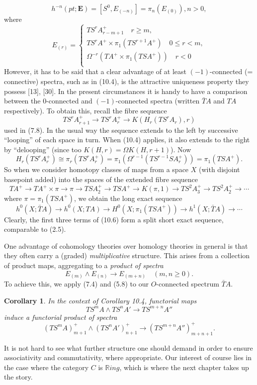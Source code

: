 \documentclass[openany,leqno]{book}  %
\newtheorem{corollary}[theorem]{Corollary}
\begin{document}
\[h^{-n}(pt;\mathbf{E}) = [S^0, E_{(-n)}] = \pi_n(E_{(0)}), n>0,\]
where
\begin{equation}
E_{(r)}=
  \begin{cases}
TS^rA^+_{r-m+1} \quad r\geqslant m, \\
TS^rA^+ \times \pi_1(TS^{r+1}A^+) \quad 0\leqslant r<m,\\
\Omega^{-r}(TA^+ \times\pi_1(TSA^+))  \quad r<0 \\
\end{cases}
\end{equation}
However, it has to be said that a clear advantage of at least $(-1)$-connected (= connective) spectra, such as in (10.4), is the attractive uniqueness property they possess [13], [30]. In the present circumstances it is handy to have a comparison between the $0$-connected and $(-1)$-connected spectra (written $\bar{T}A$ and $TA$ respectively). To obtain this, recall the fibre sequence
\[TS^rA^+_{r+1} \longrightarrow TS^rA_r^+\longrightarrow K(H_r(TS^rA_r),r)\]
used in (7.8). In the usual way the sequence extends to the left by successive ``looping'' of each space in turn. When (10.4) applies, it also extends to the right by ``delooping'' (since too $K(H,r) = \Omega K(H,r+1)$). Now
\[H_r(TS^rA_r^+) \cong \pi_r(TS^rA_r^+) = \pi_1 (\Omega^{r-1}(TS^{r-1}SA_r^+)) = \pi_1(TSA^+).\]
So when we consider homotopy classes of maps from a space $X$ (with disjoint basepoint added) into the spaces of the extended fibre sequence
\[TA^+ \longrightarrow TA^+ \times \pi \longrightarrow \pi \longrightarrow TSA_2^+ \longrightarrow TSA^+ \longrightarrow K(\pi, 1) \longrightarrow TS^2A_3^+ \longrightarrow TS^2A^+_2 \longrightarrow \cdots \]
where $\pi = \pi_1(TSA^+)$, we obtain the long exact sequence
\begin{equation}
  h^0(X; \bar{T}A) \longrightarrow h^0(X; TA)\longrightarrow  H^0(X; \pi_1(TSA^+))\longrightarrow  h^1(X; \bar{T}A)\longrightarrow  \cdots
\end{equation}
Clearly, the first three terms of (10.6) form a split short exact sequence, comparable to (2.5).

One advantage of cohomology theories over homology theories in general is that they often carry a (graded) {\em multiplicative} structure. This arises from a collection of product maps, aggregating to a {\em product of spectra}
\[E_{(m)}\wedge E_{(n)}\longrightarrow E_{(m+n)} \quad (m,n\geqslant 0).\]
To achieve this, we apply (7.4) and (5.8) to our $O$-connected spectrum $\bar{T}A$.
\begin{corollary}
  In the context of Corollary 10.4, functorial maps 
  \[TS^mA \wedge TS^nA'\longrightarrow TS^{m+n}A''\]
   induce a functorial product of spectra
   \[(TS^mA)^+_{m+1} \wedge (TS^nA')^+_{n+1}\longrightarrow (TS^{m+n}A'')^+_{m+n+1}.\]
\end{corollary}
It is not hard to see what further structure one should demand in order to ensure associativity and commutativity, where appropriate. Our interest of course lies in the case where the category $C$ is $\mathbb{R}ing$, which is where the next chapter takes up the story.
\end{document}
